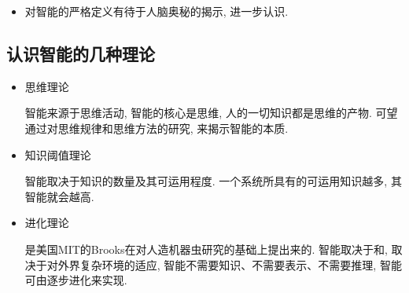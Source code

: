 \begin{itemize}
生物神经系统包含种类丰富的抑制型神经元, 它们往往在生物神经网络起到调控功能, 如同控制信息流动的路由器, 在合适的时候开启或关闭某个信号.
当下的 AI 直接用 attention 的机制 (把注意力集中放在重要的点上, 而忽略其他不重要的因素. 重要程度的判断取决于应用场景和主题的认识感知程度. 根据应用场景的不同, Attention分为空间注意力和时间注意力, 前者用于图像处理, 后者用于自然语言处理), 或者 LSTM 里的输入门来调控是否让某个输入进入网络, 其它一点类似路由器的作用, 但是种类和形式的多样性远不及生物系统. 皮层内的神经元都采取簇状结构, 细胞之间不是独立的存在, 而是聚集成团簇, 犹如一个微型的柱状体. 这些柱状体成为信息传输的基本单元. 图\ref{Glutamine013001}的右侧子图是初级感觉皮层（左）和初级运动皮层（右）的分层结构, 可以看到初级感觉皮层的第四层最厚, 而初级运动皮层的第四层特别薄.
    \begin{figure}[H]
    \begin{center}\quad\quad\quad
    \texttt{[image: Glutamine013001.PNG]}
    \texttt{[image: sjpc4792a5d1hd.jpg]}
    \end{center}
    \caption{兴奋型和抑制型神经元; 皮质小柱}
    \label{Glutamine013001}
    \end{figure}

  意识可以理解为自我对自我本身的感知.  关于意识的起源, 已经成为一个重要的神经科学探索方向, 意识与多个脑区协同的集体放电相关(The controversial correlates of consiousness – Science 2018).  但是, 关于意识的一个重大疑团是它对认知和智能到底有什么作用, 还是一个进化的副产物.

  人类大脑海马区神经元放电峰值频率500Hz, 以此推断人类大脑最大计算频率为500hz, 而现在普通电脑的cpu运算也是3.0ghz 以上, 而且还是4核芯, 每秒理论运算次数达到了惊人的120亿次, 运算速度已经远远超过人类大脑. 机器学习认知方面 当下展示出来的智力水平最多也就是3-5岁的小孩子, 计算效率存在差异.
\item 对智能的严格定义有待于人脑奥秘的揭示, 进一步认识.
\end{itemize}
\subsection{认识智能的几种理论}
\begin{itemize}
\item 思维理论

     智能来源于思维活动, 智能的核心是思维, 人的一切知识都是思维的产物. 可望通过对思维规律和思维方法的研究, 来揭示智能的本质.
\item 知识阈值理论

     智能取决于知识的数量及其可运用程度. 一个系统所具有的可运用知识越多, 其智能就会越高.
\item 进化理论

     是美国MIT的Brooks在对人造机器虫研究的基础上提出来的. 智能取决于和, 取决于对外界复杂环境的适应, 智能不需要知识、不需要表示、不需要推理, 智能可由逐步进化来实现.
\end{itemize}
